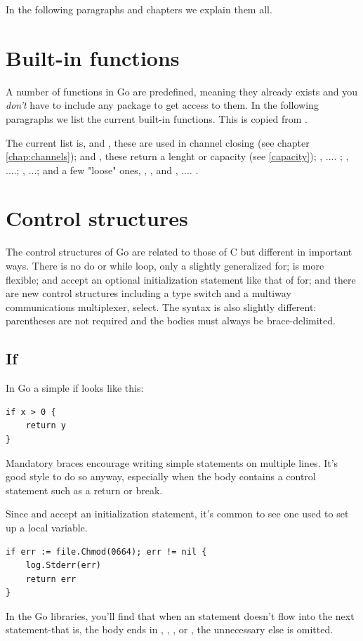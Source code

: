In the following paragraphs and chapters we explain them all.

\section{Built-in functions}
A number of functions in Go are predefined, meaning they already
exists and you \emph{don't} have to include any package to get
access to them. In the following paragraphs we list the current 
built-in functions. This is copied from \cite{go_spec}.

The current list is,  and , these are used in 
channel closing (see chapter \ref{chap:channels}); 
 and , these return a lenght or capacity (see \ref{capacity});
, .... ; , ....; , ...; and a few
"loose" ones, , ,  and
, .... .


\section{Control structures}
The control structures of Go are related to those of C but different in
important ways. There is no do or while loop, only a slightly
generalized for;  is more flexible;  and
 accept an
optional initialization statement like that of for; and there are new
control structures including a type switch and a multiway communications
multiplexer, select. The syntax is also slightly different: parentheses
are not required and the bodies must always be brace-delimited.

\subsection{If}
In Go a simple if looks like this:
\begin{lstlisting}
if x > 0 {
    return y
}
\end{lstlisting}
Mandatory braces encourage writing simple  statements on multiple
lines. It's good style to do so anyway, especially when the body
contains a control statement such as a return or break.

Since  and  accept an initialization statement, it's common to
see one used to set up a local variable.

\begin{lstlisting}
if err := file.Chmod(0664); err != nil {
    log.Stderr(err)
    return err
}
\end{lstlisting}
In the Go libraries, you'll find that when an  statement doesn't flow
into the next statement-that is, the body ends in ,
, ,
or , the unnecessary else is omitted.

